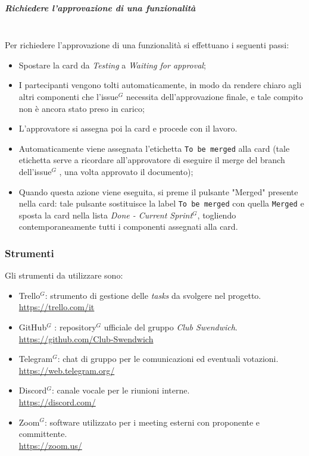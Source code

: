 \subparagraph{Richiedere l'approvazione di una funzionalità}
\mbox{}\\
Per richiedere l'approvazione di una funzionalità si effettuano i seguenti passi:
\begin{itemize}
    \item Spostare la card da \textit{Testing} a \textit{Waiting for approval};
    \item I partecipanti vengono tolti automaticamente, in modo da rendere chiaro agli altri componenti che l'issue$^G$  necessita dell'approvazione finale, e tale compito non è ancora stato preso in carico;
    \item L'approvatore si assegna poi la card e procede con il lavoro.
    \item Automaticamente viene assegnata l'etichetta \texttt{To be merged} alla card (tale etichetta serve a ricordare all'approvatore di eseguire il merge del branch dell'issue$^G$ , una volta approvato il documento);
    \item Quando questa azione viene eseguita, si preme il pulsante "Merged" presente nella card: tale pulsante sostituisce la label \texttt{To be merged} con quella \texttt{Merged} e sposta la card nella lista \textit{Done - Current Sprint}$^G$, togliendo contemporaneamente tutti i componenti assegnati alla card.
\end{itemize}

\subsubsection{Strumenti}

Gli strumenti da utilizzare sono:

\begin{itemize}
    \item Trello$^G$: strumento di gestione delle \textit{tasks} da svolgere nel progetto. \\
    \href{https://trello.com/it}{https://trello.com/it}
    \item GitHub$^G$ : repository$^G$  ufficiale del gruppo \textit{Club Swendwich}.\\
    \href{https://github.com/Club-Swendwich}{https://github.com/Club-Swendwich}
    \item Telegram$^{G}$: chat di gruppo per le comunicazioni ed eventuali votazioni. \\
    \href{https://web.telegram.org/}{https://web.telegram.org/}
    \item Discord$^{G}$: canale vocale per le riunioni interne.\\
    \href{https://discord.com/}{https://discord.com/}
    \item Zoom$^{G}$: software utilizzato per i meeting esterni con proponente e committente.\\
    \href{https://zoom.us/}{https://zoom.us/}
\end{itemize}
